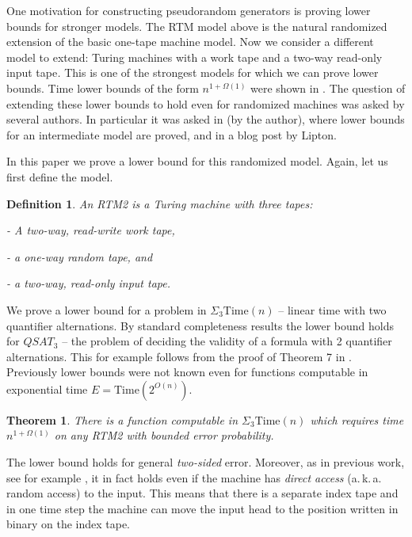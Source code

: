 \documentclass[11pt]{article}
\numberwithin{equation}{section}
\theoremstyle{definition}
\theoremstyle{plain}
\newtheorem{thm}[theorem]{Theorem}
\newtheorem{defn}[theorem]{Definition}
\newcommand{\Timee}{\mathrm{Time}}   %
\begin{document}
\medskip

One motivation for constructing pseudorandom generators is proving
lower bounds for stronger models. The RTM model above is the natural
randomized extension of the basic one-tape machine model. Now we consider
a different model to extend: Turing machines with a work tape and
a two-way read-only input tape\emph{.} This is one of the strongest
models for which we can prove lower bounds. Time lower bounds of the
form $n^{1+\Omega(1)}$ were shown in \cite{MaS87,DBLP:journals/tcs/MelkebeekR05,DBLP:journals/cc/Williams06}.
The question of extending these lower bounds to hold even for randomized
machines was asked by several authors. In particular it was asked
in \cite{Viola-PhDthesis-journal-hack,ViolaBPvsE} (by the author),
where lower bounds for an intermediate model are proved, and in a
blog post \cite{Lipton-old-ideas-and-lower-bounds-on-sat} by Lipton.

In this paper we prove a lower bound for this randomized model. Again,
let us first define the model.
\begin{defn}
An RTM2 is a Turing machine with three tapes:

- A two-way, read-write work tape,

- a one-way random tape, and

- a two-way, read-only input tape.
\end{defn}

We prove a lower bound for a problem in $\Sigma_{3}\Timee(n)$ -- linear
time with two quantifier alternations. By standard completeness results
the lower bound holds for $QSAT_{3}$ -- the problem of deciding
the validity of a formula with 2 quantifier alternations. This for
example follows from the proof of Theorem 7 in \cite{DvM06}. Previously
lower bounds were not known even for functions computable in exponential
time $E=\Timee(2^{O(n)})$.

%
\begin{thm}
\label{thm:RTM2-lb}There is a function computable in $\Sigma_{3}\Timee(n)$
which requires time $n^{1+\Omega(1)}$ on any RTM2 with bounded error
probability.
\end{thm}

The lower bound holds for general \emph{two-sided} error. Moreover,
as in previous work, see for example \cite{DBLP:journals/tcs/MelkebeekR05},
it in fact holds even if the machine has \emph{direct access}
(a.\,k.\,a.   %
random access) to the input. This means that there is a separate index
tape and in one time step the machine can move the input head to the
position written in binary on the index tape.
\end{document}
